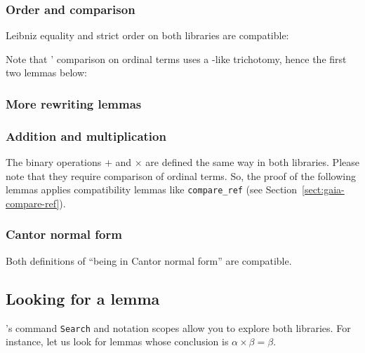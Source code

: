 \subsubsection{Order and comparison}
\label{sect:lt-compat-gaia}
Leibniz equality and strict order on both libraries are
compatible:


Note that \HydrasLib' comparison on ordinal terms uses a
\stdpp-like trichotomy, hence the first two lemmas below:

\label{sect:gaia-compare-ref}



\subsubsection{More rewriting lemmas}






\subsubsection{Addition and multiplication}
\label{sect:plus-mult-gaia-hydras}

The binary operations $+$ and $\times$ are defined the same way in both libraries. Please note that they require comparison of ordinal terms. So, the proof of the following lemmas applies
compatibility lemmas like \texttt{compare\_ref} (see Section~\vref{sect:gaia-compare-ref}).




\subsubsection{Cantor normal form}
\label{nf-gaia-compat}
Both definitions of ``being in Cantor normal form'' are
compatible.




\subsection{Looking for a lemma}
\coq's command \texttt{Search} and notation scopes allow you to explore both libraries.
For instance, let us look for lemmas whose conclusion is
$\alpha \times \beta=\beta$.

